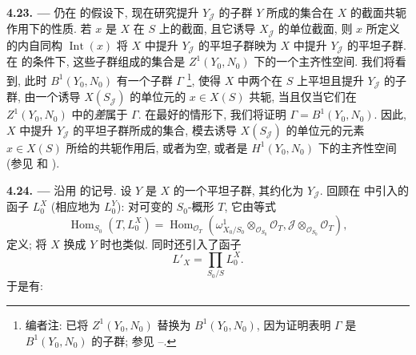 
\setcounter{footnote}{120}

\medskip
\noindent{}\textbf{4.23. ---}
仍在  的假设下, 现在研究提升
\(Y_{\mathscr J}\) 的子群 \(Y\) 所成的集合在 \(X\) 的截面共轭作用下的性质.
若 \(x\) 是 \(X\) 在 \(S\) 上的截面, 且它诱导 \(X_{\mathscr J}\) 的单位截面,
则 \(x\) 所定义的内自同构 \(\operatorname{Int}(x)\) 将 \(X\) 中提升
\(Y_{\mathscr J}\) 的平坦子群映为 \(X\) 中提升 \(Y_{\mathscr J}\) 的平坦子群.
在  的条件下,
这些子群组成的集合是 \(Z^1(Y_0,N_0)\) 下的一个主齐性空间.
我们将看到, 此时 \(B^1(Y_0,N_0)\) 有一个子群 \(\Gamma\)
\footnote{编者注: 已将 \(Z^1(Y_0,N_0)\) 替换为 \(B^1(Y_0,N_0)\),
因为证明表明 \(\Gamma\) 是 \(B^1(Y_0,N_0)\) 的子群;
参见 --.},
使得 \(X\) 中两个在 \(S\) 上平坦且提升 \(Y_{\mathscr J}\) 的子群,
由一个诱导 \(X(S_{\mathscr J})\) 的单位元的 \(x\in X(S)\) 共轭,
当且仅当它们在 \(Z^1(Y_0,N_0)\) 中的\emph{差}属于 \(\Gamma\).
在最好的情形下, 我们将证明 \(\Gamma=B^1(Y_0,N_0)\).
因此, \(X\) 中提升 \(Y_{\mathscr J}\) 的平坦子群所成的集合,
模去诱导 \(X(S_{\mathscr J})\) 的单位元的元素 \(x\in X(S)\) 所给的共轭作用后,
或者为空, 或者是 \(H^1(Y_0,N_0)\) 下的主齐性空间
(参见  和
).

\medskip
\noindent{}\textbf{4.24. ---}
沿用  的记号.
设 \(Y\) 是 \(X\) 的一个平坦子群, 其约化为 \(Y_{\mathscr J}\).
回顾在  中引入的函子 \(L_0^X\)
(相应地为 \(L_0^Y\)): 对可变的 \(S_0\)-概形 \(T\), 它由等式
\[
 \operatorname{Hom}_{S_0}(T,L_0^X)
 =\operatorname{Hom}_{\mathscr O_T}
 \left(
  \omega^1_{X_0/S_0}\otimes_{\mathscr O_{S_0}}\mathscr O_T,
  \mathscr J\otimes_{\mathscr O_{S_0}}\mathscr O_T
 \right),
\]
定义; 将 \(X\) 换成 \(Y\) 时也类似. 同时还引入了函子
\[
 L'_X=\prod_{S_0/S}L_0^X.
\]
于是有:

